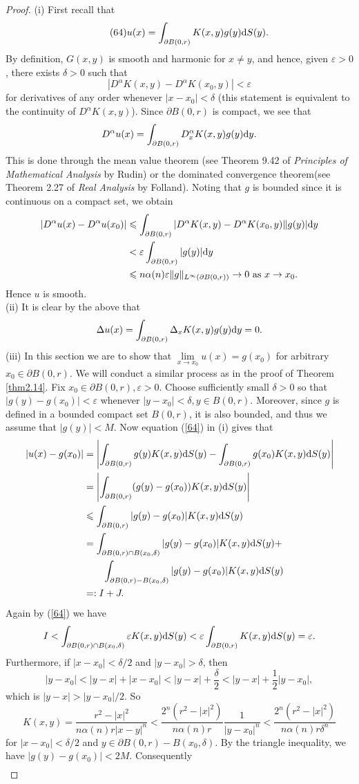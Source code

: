 \documentclass[hyperref,UTF8,12pt]{article}
\numberwithin{equation}{subsection}
\theoremstyle{plain}
\theoremstyle{definition}
\numberwithin{theorem}{section}
\numberwithin{lemma}{section}
\numberwithin{proposition}{section}
\numberwithin{remark}{section}
\numberwithin{corollary}{section}
\numberwithin{definition}{section}
\numberwithin{problem}{section}
\numberwithin{example}{section}
\def\dif{\textup{d}}
\newcommand{\dis}{\displaystyle}
\newcommand{\limls}{\lim\limits}
\newcommand{\ptl}{\partial}
\renewcommand{\leq}{\leqslant}
\newcommand{\ve}{\varepsilon}
\begin{document}
\begin{proof}
(i) First recall that \[\tag{64}\label{64}u(x)=\dis\int_{\ptl B(0,r)}K(x,y)g(y)\dif S(y).\]
 By definition, $G(x,y)$ is smooth and harmonic for $x\neq y$, and hence, given $\ve>0$, there exists $\delta>0$ such that \[|D^\alpha K(x,y)-D^\alpha K(x_0,y)|<\ve\] for derivatives of any order whenever $|x-x_0|<\delta$ (this statement is equivalent to the continuity of $D^\alpha K(x,y)$). Since $\ptl B(0,r)$ is compact, we see that \[D^\alpha u(x)=\int_{\ptl B(0,r)}D_x^\alpha K(x,y)g(y)\dif y.\]This is done 
through the mean value theorem (see Theorem 9.42 of \emph{Principles of Mathematical Analysis} by Rudin) or the dominated convergence theorem(see Theorem 2.27 of \emph{Real Analysis} by Folland). Noting that $g$ is bounded since it is continuous on a compact set, we obtain\[\begin{aligned}
	\left|D^\alpha u(x)-D^\alpha u(x_0)\right|&\leq\int_{\ptl B(0,r)}|D^\alpha K(x,y)-D^\alpha K(x_0,y)\|g(y)|\dif y\\
	&<\ve\int_{\ptl B(0,r)}|g(y)|\dif y\\
	&\leq n\alpha(n)\ve\|g\|_{L^\infty(\ptl B(0,r))}\to0~\text{as}~x\to x_0.
\end{aligned}\]Hence $u$ is smooth.\\
(ii) It is clear by the above that \[\Delta u(x)=\int_{\ptl B(0,r)}\Delta_x K(x,y)g(y)\dif y=0.\]
(iii) In this section we are to show that $\limls_{x\to x_0}u(x)=g(x_0)$ for arbitrary $x_0 \in\ptl B(0,r)$. We will conduct a similar process as in the proof of Theorem \ref{thm2.14}. Fix $x_0\in\ptl B(0,r),\ve>0$. Choose sufficiently small $\delta>0$ so that $|g(y)-g(x_0)|<\ve$ whenever $|y-x_0|<\delta,y\in B(0,r)$. Moreover, since $g$ is defined in a bounded compact set $B(0,r)$, it is also bounded, and thus we assume that $|g(y)|<M$. Now equation (\ref{64}) in (i) gives that\[\begin{aligned}
	|u(x)-g(x_0)|&=\left|\int_{\ptl B(0,r)}g(y)K(x,y)\dif S(y)-\int_{\ptl B(0,r)}g(x_0)K(x, y)\dif S(y)\right|\\
	&=\left|\int_{\ptl B(0,r)}(g(y)-g(x_0))K(x,y)\dif S(y)\right|\\
	&\leq\int_{\ptl B(0,r)}|g(y)-g(x_0)|K(x,y)\dif S(y)\\
	&=\int_{\ptl B(0,r)\cap B(x_0,\delta)}|g(y)-g(x_0)|K(x,y)\dif S(y)+\\
	&\qquad\int_{\ptl B(0,r)-B(x_0,\delta)}|g(y)-g(x_0)|K(x,y)\dif S(y)\\
	&=:I+J.
\end{aligned}\]Again by (\ref{64}) we have \[I<\int_{\ptl B(0,r)\cap B(x_0,\delta)}\ve K(x,y)\dif S(y)<\ve\int_{\ptl B(0,r)}K(x,y)\dif S(y)=\ve.\]Furthermore, if $|x-x_0|<\delta/2$ and $|y-x_0|>\delta$, then\[|y-x_0|<|y-x|+|x-x_0|<|y-x|+ \frac{\delta}{2}<|y-x|+\frac{1}{2} |y-x_0|,\] which is $|y-x|>|y-x_0|/2$. So\[K(x,y)= \frac{r^2-|x|^2}{n\alpha(n)r|x-y|^n}<\frac{2^n(r^2-|x|^2)}{n\alpha(n)r}\frac{1}{|y-x_0|^n}<\frac{2^n(r^2-|x|^2)}{n\alpha(n)r\delta^n}\]for $|x-x_0|<\delta/2$ and $y\in\ptl B(0,r)-B(x_0,\delta)$. By the triangle inequality, we have $|g(y)-g(x_0)|<2M$. Consequently\[\begin{aligned}

\end{aligned}\]
\end{proof}
\end{document}

